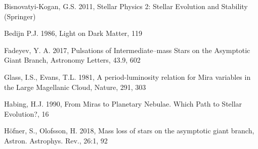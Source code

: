 \documentclass[a4paper,11pt,twocolumn]{article}
\begin{document}
\begin{thebibliography}{9}
    
    Bisnovatyi-Kogan, G.S. 2011, Stellar Physics 2: Stellar Evolution and Stability (Springer)
    

    Bedijn P.J. 1986, Light on Dark Matter, 119


    Fadeyev, Y. A. 2017, Pulsations of Intermediate–mass Stars on the Asymptotic Giant Branch,  Astronomy Letters, 43.9, 602


    Glass, I.S., Evans, T.L. 1981, A period-luminosity relation for Mira variables in the Large Magellanic Cloud, Nature, 291, 303

    Habing, H.J. 1990, From Miras to Planetary Nebulae. Which Path to Stellar Evolution?, 16 

    Höfner, S., Olofsson, H. 2018, Mass loss of stars on the asymptotic giant branch, Astron. Astrophys. Rev., 26:1, 92



\end{thebibliography}
\end{document}
